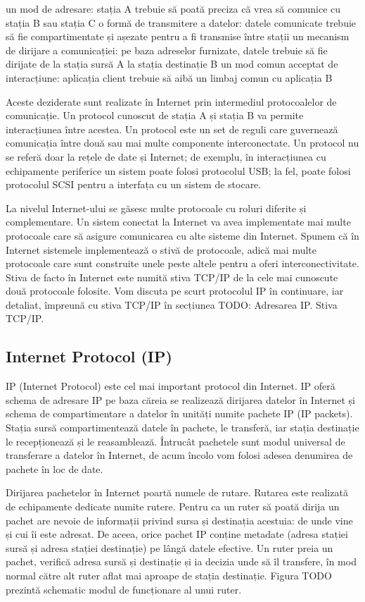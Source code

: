 un mod de adresare: stația A trebuie să poată preciza că vrea să comunice cu stația B sau stația C
o formă de transmitere a datelor: datele comunicate trebuie să fie compartimentate și așezate pentru a fi transmise între stații
un mecanism de dirijare a comunicației: pe baza adreselor furnizate, datele trebuie să fie dirijate de la stația sursă A la stația destinație B
un mod comun acceptat de interacțiune: aplicația client trebuie să aibă un limbaj comun cu aplicația B

Aceste deziderate sunt realizate în Internet prin intermediul protocoalelor de comunicație. Un protocol cunoscut de stația A și stația B va permite interacțiunea între acestea. Un protocol este un set de reguli care guvernează comunicația între două sau mai multe componente interconectate. Un protocol nu se referă doar la rețele de date și Internet; de exemplu, în interacțiunea cu echipamente periferice un sistem poate folosi protocolul USB; la fel, poate folosi protocolul SCSI pentru a interfața cu un sistem de stocare.

La nivelul Internet-ului se găsesc multe protocoale cu roluri diferite și complementare. Un sistem conectat la Internet va avea implementate mai multe protocoale care să asigure comunicarea cu alte sisteme din Internet. Spunem că în Internet sistemele implementează o stivă de protocoale, adică mai multe protocoale care sunt construite unele peste altele pentru a oferi interconectivitate. Stiva de facto în Internet este numită stiva TCP/IP de la cele mai cunoscute două protocoale folosite. Vom discuta pe scurt protocolul IP în continuare, iar detaliat, împreună cu stiva TCP/IP în secțiunea TODO: Adresarea IP. Stiva TCP/IP.

\subsection{Internet Protocol (IP)}
\label{sec:net:ip}

IP (Internet Protocol) este cel mai important protocol din Internet. IP oferă schema de adresare IP pe baza căreia se realizează dirijarea datelor în Internet și schema de compartimentare a datelor în unități numite pachete IP (IP packets). Stația sursă compartimentează datele în pachete, le transferă, iar stația destinație le recepționează și le reasamblează. Întrucât pachetele sunt modul universal de transferare a datelor în Internet, de acum încolo vom folosi adesea denumirea de pachete în loc de date.

Dirijarea pachetelor în Internet poartă numele de rutare. Rutarea este realizată de echipamente dedicate numite rutere. Pentru ca un ruter să poată dirija un pachet are nevoie de informații privind sursa și destinația acestuia: de unde vine și cui îi este adresat. De aceea, orice pachet IP conține metadate (adresa stației sursă și adresa stației destinație) pe lângă datele efective. Un ruter preia un pachet, verifică adresa sursă și destinație și ia decizia unde să îl transfere, în mod normal către alt ruter aflat mai aproape de stația destinație. Figura TODO prezintă schematic modul de funcționare al unui ruter.


